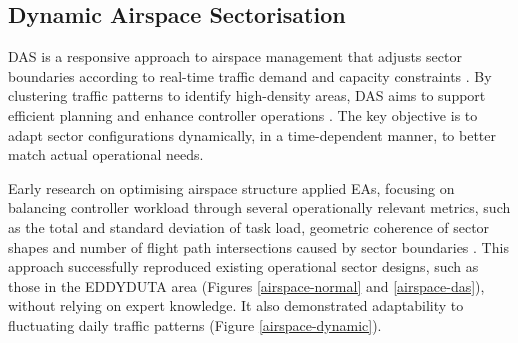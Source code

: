 \subsection{Dynamic Airspace Sectorisation}

\Gls{DAS} is a responsive approach to airspace management that adjusts sector boundaries according to real-time traffic demand and capacity constraints \cite{Zhou_2023}.
By clustering traffic patterns to identify high-density areas, \gls{DAS} aims to support efficient planning and enhance controller operations \cite{Schultz_2018}.
The key objective is to adapt sector configurations dynamically, in a time-dependent manner, to better match actual operational needs.

Early research on optimising airspace structure applied \glspl{EA}, focusing on balancing controller workload through several operationally relevant metrics, such as the total and standard deviation of task load, geometric coherence of sector shapes and number of flight path intersections caused by sector boundaries \cite{Schultz_2018}.
This approach successfully reproduced existing operational sector designs, such as those in the EDDYDUTA area (Figures \ref{airspace-normal} and \ref{airspace-das}), without relying on expert knowledge.
It also demonstrated adaptability to fluctuating daily traffic patterns (Figure \ref{airspace-dynamic}).


